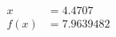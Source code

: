 \documentclass[preview]{standalone}
\begin{document}
\begin{align*}
x &= 4.4707\\f(x) &= 7.9639482
\end{align*}
\end{document}
